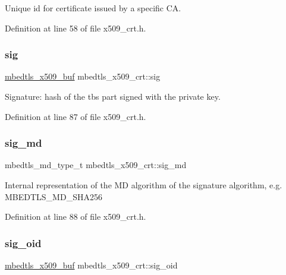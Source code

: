 Unique id for certificate issued by a specific CA. 

Definition at line 58 of file x509\+\_\+crt.\+h.

\mbox{\label{structmbedtls__x509__crt_aea76ebaa8c8e23129bd905cdc0242a3a}} 
\subsubsection{\texorpdfstring{sig}{sig}}
{\footnotesize\ttfamily \mbox{\hyperlink{group__x509__module_ga4d02c9e8e4e2934555e0d132cd2976dc}{mbedtls\+\_\+x509\+\_\+buf}} mbedtls\+\_\+x509\+\_\+crt\+::sig}

Signature\+: hash of the tbs part signed with the private key. 

Definition at line 87 of file x509\+\_\+crt.\+h.

\mbox{\label{structmbedtls__x509__crt_a5c56937aaf2a51a1d8bc814b142734ca}} 
\subsubsection{\texorpdfstring{sig\+\_\+md}{sig\_md}}
{\footnotesize\ttfamily mbedtls\+\_\+md\+\_\+type\+\_\+t mbedtls\+\_\+x509\+\_\+crt\+::sig\+\_\+md}

Internal representation of the MD algorithm of the signature algorithm, e.\+g. M\+B\+E\+D\+T\+L\+S\+\_\+\+M\+D\+\_\+\+S\+H\+A256 

Definition at line 88 of file x509\+\_\+crt.\+h.

\mbox{\label{structmbedtls__x509__crt_a128c3a665ffdce696b402435a74e97aa}} 
\subsubsection{\texorpdfstring{sig\+\_\+oid}{sig\_oid}}
{\footnotesize\ttfamily \mbox{\hyperlink{group__x509__module_ga4d02c9e8e4e2934555e0d132cd2976dc}{mbedtls\+\_\+x509\+\_\+buf}} mbedtls\+\_\+x509\+\_\+crt\+::sig\+\_\+oid}


